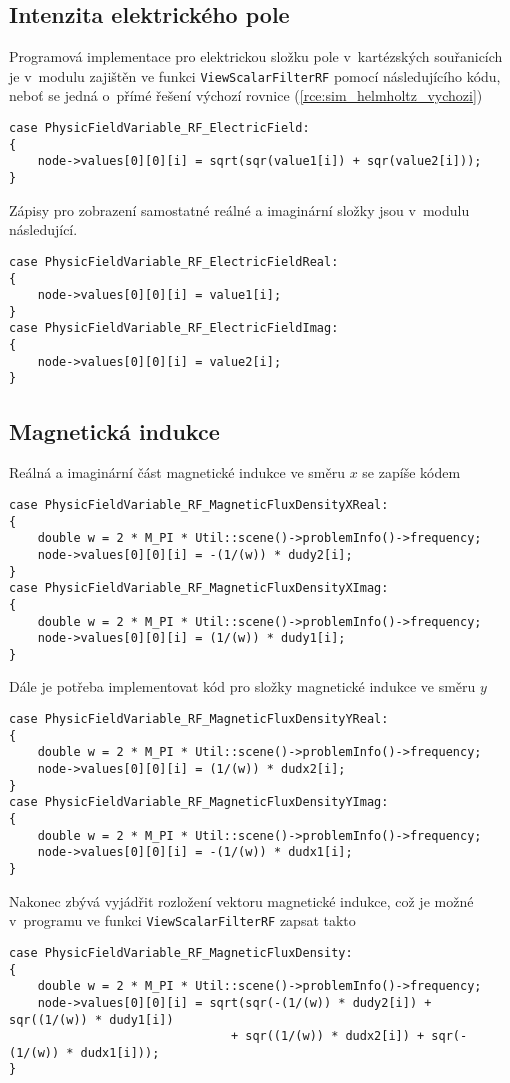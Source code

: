\subsection*{Intenzita elektrického pole}
Programová implementace pro elektrickou složku pole v~kartézských souřanicích je v~modulu zajištěn ve funkci \texttt{ViewScalarFilterRF} pomocí následujícího kódu, neboť se jedná o~přímé řešení výchozí rovnice (\ref{rce:sim_helmholtz_vychozi})
\begin{verbatim}
case PhysicFieldVariable_RF_ElectricField:
{
    node->values[0][0][i] = sqrt(sqr(value1[i]) + sqr(value2[i]));
}    
\end{verbatim}
Zápisy pro zobrazení samostatné reálné a imaginární složky jsou v~modulu následující.
\begin{verbatim}
case PhysicFieldVariable_RF_ElectricFieldReal:
{
    node->values[0][0][i] = value1[i];
}    
case PhysicFieldVariable_RF_ElectricFieldImag:
{    
    node->values[0][0][i] = value2[i];
}
\end{verbatim}

\subsection*{Magnetická indukce}
Reálná a imaginární část magnetické indukce ve směru $x$ se zapíše kódem
\begin{verbatim}
case PhysicFieldVariable_RF_MagneticFluxDensityXReal:
{
    double w = 2 * M_PI * Util::scene()->problemInfo()->frequency;
    node->values[0][0][i] = -(1/(w)) * dudy2[i];
}
case PhysicFieldVariable_RF_MagneticFluxDensityXImag:
{
    double w = 2 * M_PI * Util::scene()->problemInfo()->frequency;
    node->values[0][0][i] = (1/(w)) * dudy1[i];
}    
\end{verbatim}
Dále je potřeba implementovat kód pro složky magnetické indukce ve směru $y$
\begin{verbatim}
case PhysicFieldVariable_RF_MagneticFluxDensityYReal:
{
    double w = 2 * M_PI * Util::scene()->problemInfo()->frequency;
    node->values[0][0][i] = (1/(w)) * dudx2[i];
}
case PhysicFieldVariable_RF_MagneticFluxDensityYImag:
{
    double w = 2 * M_PI * Util::scene()->problemInfo()->frequency;
    node->values[0][0][i] = -(1/(w)) * dudx1[i];
}
\end{verbatim}
Nakonec zbývá vyjádřit rozložení vektoru magnetické indukce, což je možné v~programu ve funkci \texttt{ViewScalarFilterRF} zapsat takto
\begin{verbatim}
case PhysicFieldVariable_RF_MagneticFluxDensity:
{
    double w = 2 * M_PI * Util::scene()->problemInfo()->frequency;
    node->values[0][0][i] = sqrt(sqr(-(1/(w)) * dudy2[i]) + sqr((1/(w)) * dudy1[i])
                               + sqr((1/(w)) * dudx2[i]) + sqr(-(1/(w)) * dudx1[i]));
}
\end{verbatim}

